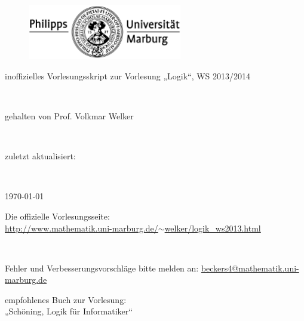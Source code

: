\documentclass[a4paper, titlepage]{scrartcl}
\begin{document}


\begin{figure}[h]
\centering
\includegraphics[width=0.6\textwidth]{vl_data/logo.png}
\end{figure}

\begin{center}
\begin{huge}inoffizielles Vorlesungsskript zur Vorlesung „Logik“, WS 2013/2014\end{huge}\\
\vspace{1cm}
\begin{large}gehalten von Prof. Volkmar Welker\end{large}\\
\vspace{1cm}
\begin{small}zuletzt aktualisiert:\end{small}\\
\begin{Large}\today \end{Large}
\end{center}

\noindent
\begin{center}
Die offizielle Vorlesungsseite:\\
\href{http://www.mathematik.uni-marburg.de/~welker/logik\_ws2013.html}{http://www.mathematik.uni-marburg.de/$\sim$welker/logik\_ws2013.html}
\end{center}

\noindent\\
\begin{center}\begin{Large}Fehler und Verbesserungsvorschläge bitte melden an: \href{mailto:beckers4@mathematik.uni-marburg.de}{beckers4@mathematik.uni-marburg.de}\end{Large}\end{center}
\vspace{1cm}
\begin{center}
empfohlenes Buch zur Vorlesung:\\
„Schöning, Logik für Informatiker“
\end{center}
\end{document}
